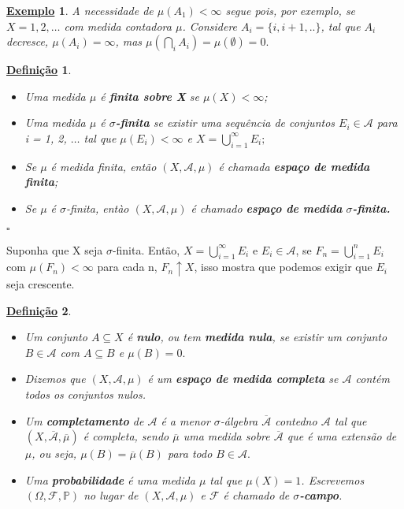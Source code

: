 \documentclass{article}
\newtheorem*{def*}{\underline{Defini\c c\~ao}}
\newtheorem{example}{\underline{Exemplo}}
\begin{document}
\begin{example}
	A necessidade de \(\mu (A_1) < \infty\) segue pois, por exemplo, se \(X = 1, 2, \dotsc \) com medida contadora \(\mu \). Considere \(A_{i} = \{i, i+1, ..\}\), tal que \(A_{i}\) decresce,
	\(\mu (A_{i}) = \infty\), mas \(\mu (\bigcap_{i}^{}A_{i}) = \mu (\emptyset ) = 0.\)
\end{example}
\begin{def*}
	\begin{itemize}
		\item[a)] Uma medida \(\mu \) é \textbf{finita sobre X} se \(\mu (X) < \infty\);
		\item[b)] Uma medida \(\mu \) é \(\sigma \)\textbf{-finita} se existir uma sequência de conjuntos \(E_{i}\in \mathcal{A}\) para i = 1, 2, \(\dotsc \) tal que
		      \(\mu (E_{i}) < \infty\) e \(X = \bigcup_{i=1}^{\infty}E_{i};\)
		\item[c)] Se \(\mu \) é medida finita, então \((X, \mathcal{A}, \mu )\) é chamada \textbf{espaço de medida finita};
		\item[d)] Se \(\mu \) é \(\sigma \)-finita, entào \((X, \mathcal{A}, \mu )\) é chamado \textbf{espaço de medida} \(\sigma \)\textbf{-finita.}
	\end{itemize} \(\square\)

\end{def*}
Suponha que X seja \(\sigma \)-finita. Então, \(X = \bigcup_{i=1}^{\infty}E_{i}\) e \(E_{i}\in \mathcal{A}\), se \(F_{n} = \bigcup_{i=1}^{n}E_{i}\) com \(\mu (F_{n}) < \infty\) para cada n, \(F_{n}\uparrow X\), isso mostra
que podemos exigir que \(E_{i}\) seja crescente.
\begin{def*}
	\begin{itemize}
		\item[i)] Um conjunto \(A\subseteq X\) é \textbf{nulo}, ou tem \textbf{medida nula}, se existir um conjunto \(B\in \mathcal{A}\) com \(A\subseteq B\) e \(\mu (B) = 0.\)
		\item[ii)] Dizemos que \((X, \mathcal{A}, \mu )\) é um \textbf{espaço de medida completa} se \(\mathcal{A}\) contém todos os conjuntos nulos.
		\item[iii)] Um \textbf{completamento} de \(\mathcal{A}\) é a menor \(\sigma \)-álgebra \(\overline{\mathcal{A}}\) contedno \(\mathcal{A}\) tal que \((X, \overline{\mathcal{A}}, \overline{\mu })\) é completa,
		      sendo \(\overline{\mu} \) uma medida sobre \(\overline{\mathcal{A}}\) que é uma extensão de \(\mu \), ou seja, \(\mu(B) = \overline{\mu }(B)\) para todo \(B\in \mathcal{A}.\)
		\item[iv)] Uma \textbf{probabilidade} é uma medida \(\mu \) tal que \(\mu (X) = 1\). Escrevemos \((\Omega , \mathcal{F}, \mathbb{P})\) no lugar de \((X, \mathcal{A}, \mu )\) e \(\mathcal{F}\) é chamado de \(\sigma \)\textbf{-campo}.
	\end{itemize}
\end{def*}
\end{document}

